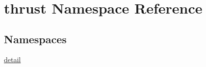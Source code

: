 \hypertarget{namespacethrust}{}\section{thrust Namespace Reference}
\label{namespacethrust}
\subsection*{Namespaces}
\begin{DoxyCompactItemize}
\item 
 \hyperlink{namespacethrust_1_1detail}{detail}
\end{DoxyCompactItemize}
